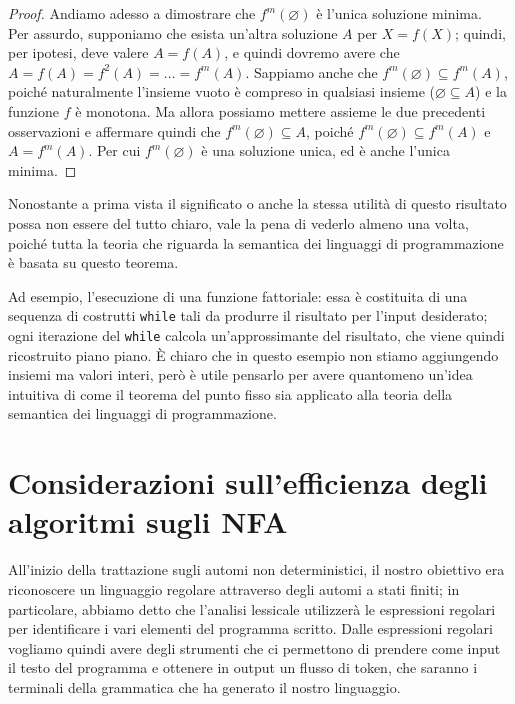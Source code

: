 \documentclass[class=book, crop=false, oneside, 12pt]{standalone}
\begin{document}
\begin{proof}
    Andiamo adesso a dimostrare che \(f^m(\varnothing)\) è l'unica soluzione minima.\\
    Per assurdo, supponiamo che esista un'altra soluzione \(A\) per \(X = f(X)\); quindi, per ipotesi, deve valere \(A = f(A)\), e quindi dovremo avere che \(A = f(A) = f^2(A) = \ldots = f^m(A)\). Sappiamo anche che \(f^m(\varnothing) \subseteq f^m(A)\), poiché naturalmente l'insieme vuoto è compreso in qualsiasi insieme (\(\varnothing \subseteq A\)) e la funzione \(f\) è monotona. Ma allora possiamo mettere assieme le due precedenti osservazioni e affermare quindi che \(f^m(\varnothing) \subseteq A\), poiché \(f^m(\varnothing) \subseteq f^m(A)\) e \(A = f^m(A)\). Per cui \(f^m(\varnothing)\) è una soluzione unica, ed è anche l'unica minima. 

\end{proof}

Nonostante a prima vista il significato o anche la stessa utilità di questo risultato possa non essere del tutto chiaro, vale la pena di vederlo almeno una volta, poiché tutta la teoria che riguarda la semantica dei linguaggi di programmazione è basata su questo teorema. 

Ad esempio, l'esecuzione di una funzione fattoriale: essa è costituita di una sequenza di costrutti \texttt{while} tali da produrre il risultato per l'input desiderato; ogni iterazione del \texttt{while} calcola un'approssimante del risultato, che viene quindi ricostruito piano piano. È chiaro che in questo esempio non stiamo aggiungendo insiemi ma valori interi, però è utile pensarlo per avere quantomeno un'idea intuitiva di come il teorema del punto fisso sia applicato alla teoria della semantica dei linguaggi di programmazione.

\section{Considerazioni sull'efficienza degli algoritmi sugli NFA}
All'inizio della trattazione sugli automi non deterministici, il nostro obiettivo era riconoscere un linguaggio regolare attraverso degli automi a stati finiti; in particolare, abbiamo detto che l'analisi lessicale utilizzerà le espressioni regolari per identificare i vari elementi del programma scritto. Dalle espressioni regolari vogliamo quindi avere degli strumenti che ci permettono di prendere come input il testo del programma e ottenere in output un flusso di token, che saranno i terminali della grammatica che ha generato il nostro linguaggio.
\end{document}
